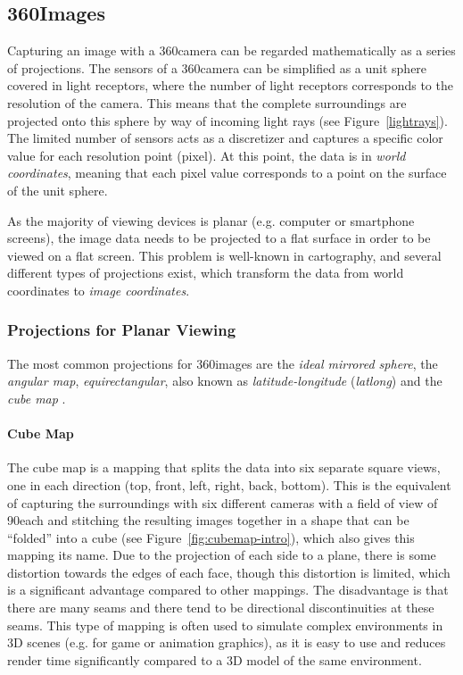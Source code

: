 \subsection{360\degree Images}
Capturing an image with a 360\degree camera can be regarded mathematically as a series of projections. The sensors of a 360\degree camera can be simplified as a unit sphere covered in light receptors, where the number of light receptors corresponds to the resolution of the camera. This means that the complete surroundings are projected onto this sphere by way of incoming light rays (see Figure~\ref{lightrays}). The limited number of sensors acts as a discretizer and captures a specific color value for each resolution point (pixel). At this point, the data is in \emph{world coordinates}, meaning that each pixel value corresponds to a point on the surface of the unit sphere. 

As the majority of viewing devices is planar (e.g. computer or smartphone screens), the image data needs to be projected to a flat surface in order to be viewed on a flat screen. This problem is well-known in cartography, and several different types of projections exist, which transform the data from world coordinates to \emph{image coordinates}.

\subsubsection{Projections for Planar Viewing \label{projections} \cite{hdrbook}}
The most common projections for 360\degree images are the \emph{ideal mirrored sphere}, the \emph{angular map},  \emph{equirectangular}, also known as \emph{latitude-longitude} (\emph{latlong}) and the \emph{cube map} \cite{hdrbook}.

\paragraph{Cube Map}
The cube map is a mapping that splits the data into six separate square views, one in each direction (top, front, left, right, back, bottom). This is the equivalent of capturing the surroundings with six different cameras with a field of view of 90\degree each and stitching the resulting images together in a shape that can be ``folded'' into a cube (see Figure~\ref{fig:cubemap-intro}), which also gives this mapping its name.
Due to the projection of each side to a plane, there is some distortion towards the edges of each face, though this distortion is limited, which is a significant advantage compared to other mappings. The disadvantage is that there are many seams and there tend to be directional discontinuities at these seams. This type of mapping is often used to simulate complex environments in 3D scenes (e.g. for game or animation graphics), as it is easy to use and reduces render time significantly compared to a 3D model of the same environment.
\cite{hdrbook}

